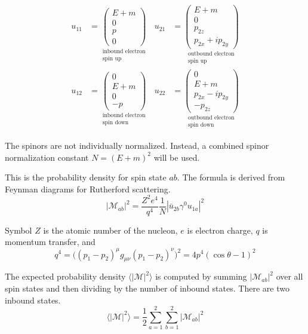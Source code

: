 \documentclass[12pt]{article}
\begin{document}
\begin{align*}
u_{11}&=
\underset{\substack{\text{inbound electron}\\\text{spin up}}}
{
\begin{pmatrix}E+m\\0\\p\\0\end{pmatrix}
}
&
u_{21}&=
\underset{\substack{\text{outbound electron}\\\text{spin up}}}
{
\begin{pmatrix}E+m\\0\\p_{2z}\\p_{2x}+ip_{2y}\end{pmatrix}
}
\\[1ex]
u_{12}&=
\underset{\substack{\text{inbound electron}\\\text{spin down}}}
{
\begin{pmatrix}0\\E+m\\0\\-p\end{pmatrix}
}
&
u_{22}&=
\underset{\substack{\text{outbound electron}\\\text{spin down}}}
{
\begin{pmatrix}0\\E+m\\p_{2x}-ip_{2y}\\-p_{2z}\end{pmatrix}
}
\end{align*}

The spinors are not individually normalized.
Instead, a combined spinor normalization constant $N=(E+m)^2$ will be used.

\bigskip
This is the probability density for spin state $ab$.
The formula is derived from Feynman diagrams for Rutherford scattering.
\begin{equation*}
|\mathcal{M}_{ab}|^2=\frac{Z^2e^4}{q^4}\frac{1}{N}\left|\bar{u}_{2b}\gamma^0 u_{1a}\right|^2
\end{equation*}

Symbol $Z$ is the atomic number of the nucleon, $e$ is electron charge,
$q$ is momentum transfer, and
\begin{equation*}
q^4=\big((p_1-p_2)^\mu g_{\mu\nu}(p_1-p_2)^\nu\big)^2=4p^4(\cos\theta-1)^2
\end{equation*}

The expected probability density
$\langle\vert\mathcal{M}\vert^2\rangle$
is computed by summing $|\mathcal{M}_{ab}|^2$
over all spin states and then dividing by the number of inbound states.
There are two inbound states.
\begin{equation*}
\langle\vert\mathcal{M}\vert^2\rangle
=\frac{1}{2}\sum_{a=1}^2\sum_{b=1}^2\left|\mathcal{M}_{ab}\right|^2
\end{equation*}
\end{document}
